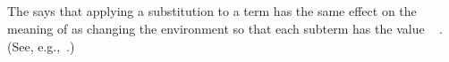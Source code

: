 \begin{code}
%
\>[1]\AgdaSpace{}%
\AgdaSymbol{:}\AgdaSpace{}%
\AgdaSymbol{\{}\AgdaSpace{}%
\AgdaSymbol{:}\AgdaSpace{}%
\AgdaSpace{}%
\AgdaSymbol{\}}\AgdaSpace{}%
\AgdaSpace{}%
\AgdaSpace{}%
\AgdaSymbol{(}\AgdaSpace{}%
\AgdaSymbol{\{}\AgdaSpace{}%
\AgdaSymbol{=}\AgdaSpace{}%
\AgdaSymbol{\})}\<%
\\
%
\>[1]%
\>[9]\AgdaSpace{}%
\AgdaSymbol{=}\AgdaSpace{}%
\AgdaSpace{}%
\AgdaBound{\AgdaUnderscore{}}%
\>[35]\AgdaSpace{}%
\<%
\\
%
\>[1]%
\>[9]\AgdaSpace{}%
\AgdaSymbol{=}\AgdaSpace{}%
\AgdaSpace{}%
\AgdaSpace{}%
%
\>[35]\AgdaSpace{}%
\AgdaSpace{}%
\AgdaSymbol{(}\AgdaSpace{}%
\AgdaSymbol{)}\<%
\\
%
\>[1]%
\>[9]\AgdaSpace{}%
\AgdaSymbol{=}\AgdaSpace{}%
\AgdaSpace{}%
\AgdaSpace{}%
\AgdaSpace{}%
%
\>[35]\AgdaSpace{}%
\AgdaSpace{}%
\AgdaSymbol{(}\AgdaSpace{}%
\AgdaSymbol{)}\AgdaSpace{}%
\AgdaSymbol{(}\AgdaSpace{}%
\AgdaSymbol{)}\<%
\\
\>[0]\<%
\end{code}
\fi

The  says that applying a substitution  to a term 
has the same effect on the meaning of  as changing the environment so that each
subterm  has the value ~ . (See, e.g.,~\cite[Lemma 3.3.11]{Mitchell:1996}.)

